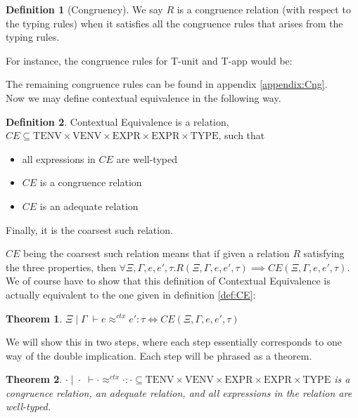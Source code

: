 \documentclass[twoside,11pt,openright]{report}
\newtheorem{theorem}{Theorem}
\theoremstyle{definition}
\newtheorem{definition}{Definition}[section]
\newcommand{\expr}{e}
\newcommand{\TT}{()}
\newcommand{\Tvar}{X}
\newcommand{\Tapp}[1]{#1\;\_}
\newcommand{\subst}[3]{#1{\left[#3 \middle/ #2 \right]}}
\newcommand{\Tunit}{\mathsf{Unit}}
\newcommand{\Tall}[2]{\forall #1.\; #2}
\newcommand{\typ}{\tau}
\newcommand{\venv}{\Gamma}
\newcommand{\tenv}{\Xi}
\newcommand{\VENV}{\mathrm{VENV}}
\newcommand{\TENV}{\mathrm{TENV}}
\newcommand{\EXPR}{\mathrm{EXPR}}
\newcommand{\TYPE}{\mathrm{TYPE}}
\newcommand{\jdgRel}[6]{#1 \; | \; #2 \; \vdash #3 \approx^{#4} #5 : #6}
\newcommand{\ctxRel}[5]{\jdgRel{#1}{#2}{#3}{ctx}{#4}{#5}}
\begin{document}
\begin{definition}[Congruency]
  We say $R$ is a congruence relation (with respect to the typing rules) when it satisfies all the congruence rules that arises from the typing rules.
\end{definition}
For instance, the congruence rules for T-unit and T-app would be:
The remaining congruence rules can be found in appendix \ref{appendix:Cng}.\\
Now we may define contextual equivalence in the following way.
\begin{definition}\label{def:CE2}
  Contextual Equivalence is a relation, $CE \subseteq \TENV \times \VENV \times \EXPR \times \EXPR \times \TYPE$, such that
  \begin{itemize}
    \item all expressions in $CE$ are well-typed
    \item $CE$ is a congruence relation
    \item $CE$ is an adequate relation
  \end{itemize}
  Finally, it is the coarsest such relation.
\end{definition}
$CE$ being the coarsest such relation means that if given a relation $R$ satisfying the three properties, then $\forall \tenv, \venv, \expr, \expr', \typ . R(\tenv, \venv, \expr, \expr', \typ) \implies CE(\tenv, \venv, \expr, \expr', \typ)$.\\
We of course have to show that this definition of Contextual Equivalence is actually equivalent to the one given in definition \ref{def:CE}:
\begin{theorem}\label{thm:CE_eq}
  $\ctxRel{\tenv}{\venv}{\expr}{\expr'}{\typ} \iff CE(\tenv, \venv, \expr, \expr', \typ)$
\end{theorem}
We will show this in two steps, where each step essentially corresponds to one way of the double implication. Each step will be phrased as a theorem.
\begin{theorem}\label{thm:CE_eq_part1}
  $\ctxRel{\cdot}{\cdot}{\cdot}{\cdot}{\cdot} \subseteq \TENV \times \VENV \times \EXPR \times \EXPR \times \TYPE$ is a congruence relation, an adequate relation, and all expressions in the relation are well-typed.
\end{theorem}
\end{document}
